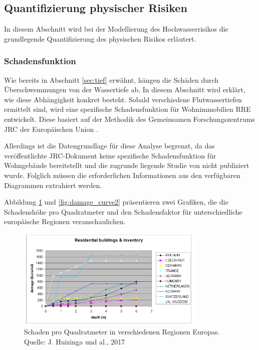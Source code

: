 \subsection{Quantifizierung physischer Risiken}
In diesem Abschnitt wird bei der Modellierung des Hochwasserrisikos die grundlegende Quantifizierung des physischen Risikos erläutert.

\subsubsection{Schadensfunktion}\label{sec:schadenfkt}
Wie bereits in Abschnitt \ref{sec:tief} erwähnt, hängen die Schäden durch Überschwemmungen von der Wassertiefe ab. In diesem Abschnitt wird erklärt, wie diese Abhängigkeit konkret besteht.
Sobald verschiedene Flutwassertiefen ermittelt sind, wird eine spezifische Schadensfunktion für Wohnimmobilien \acs{RRE} entwickelt. Diese basiert auf der Methodik des Gemeinsamen Forschungszentrums \acs{JRC} der Europäischen Union \parencite{huizinga2017global}.

Allerdings ist die Datengrundlage für diese Analyse begrenzt, da das veröffentlichte \acs{JRC}-Dokument keine spezifische Schadensfunktion für Wohngebäude bereitstellt und die zugrunde liegende Studie von \textcite{huizinga2007flood} nicht publiziert wurde. Folglich müssen die erforderlichen Informationen aus den verfügbaren Diagrammen extrahiert werden.

Abbildung \ref{fig:damage_curve1} und \ref{fig:damage_curve2} präsentieren zwei Grafiken, die die Schadenshöhe pro Quadratmeter und den Schadensfaktor für unterschiedliche europäische Regionen veranschaulichen.

\begin{figure}[H]
    \centering
    \includegraphics[width=0.8\textwidth]{figures/RREdamagem2.png}
    \caption{Schaden pro Quadratmeter in verschiedenen Regionen Europas. Quelle: J. Huizinga und al., 2017}
    \label{fig:damage_curve1}
\end{figure}

